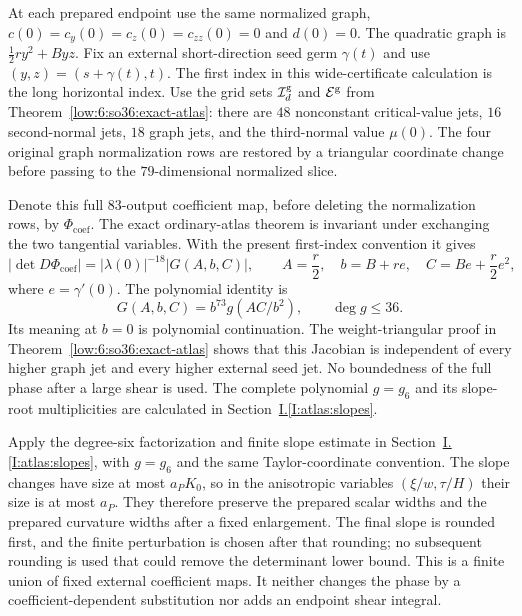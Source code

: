 \documentclass[11pt]{amsart}
\theoremstyle{definition}
\theoremstyle{remark}
\numberwithin{equation}{section}
\newcommand{\partIref}[1]{\hyperref[I:#1]{I.\ref*{I:#1}}}
\begin{document}
At each prepared endpoint use the same normalized graph, $c(0)=c_y(0)=c_z(0)=c_{zz}(0)=0$ and $d(0)=0$. The quadratic graph is $\tfrac12ry^2+Byz$. Fix an external short-direction seed germ $\gamma(t)$ and use $(y,z)=(s+\gamma(t),t)$. The first index in this wide-certificate calculation is the long horizontal index. Use the grid sets $\mathcal I_d^{\rm g}$ and $\mathcal E^{\rm g}$ from Theorem~\ref{low:6:so36:exact-atlas}: there are $48$ nonconstant critical-value jets, $16$ second-normal jets, $18$ graph jets, and the third-normal value $\mu(0)$. The four original graph normalization rows are restored by a triangular coordinate change before passing to the $79$-dimensional normalized slice.

Denote this full $83$-output coefficient map, before deleting the normalization rows, by $\Phi_{\mathrm{coef}}$. The exact ordinary-atlas theorem is invariant under exchanging the two tangential variables. With the present first-index convention it gives
\begin{equation}\label{low:6:wc36:atlas}
 |\det D\Phi_{\mathrm{coef}}|=|\lambda(0)|^{-18}|G(A,b,C)|,
 \qquad A=\frac r2,\quad b=B+re,\quad C=Be+\frac r2e^2,
\end{equation}
where $e=\gamma'(0)$. The polynomial identity is
\begin{equation}\label{low:6:wc36:G}
G(A,b,C)=b^{73}g(AC/b^2),\qquad \deg g\le36.
\end{equation}
Its meaning at $b=0$ is polynomial continuation. The weight-triangular proof in Theorem~\ref{low:6:so36:exact-atlas} shows that this Jacobian is independent of every higher graph jet and every higher external seed jet. No boundedness of the full phase after a large shear is used. The complete polynomial $g=g_6$ and its slope-root multiplicities are calculated in Section~\partIref{atlas:slopes}.

Apply the degree-six factorization and finite slope estimate in Section~\partIref{atlas:slopes}, with $g=g_6$ and the same Taylor-coordinate convention.
The slope changes have size at most $a_PK_0$, so in the anisotropic variables $(\xi/w,\tau/H)$ their size is at most $a_P$. They therefore preserve the prepared scalar widths and the prepared curvature widths after a fixed enlargement. The final slope is rounded first, and the finite perturbation is chosen after that rounding; no subsequent rounding is used that could remove the determinant lower bound. This is a finite union of fixed external coefficient maps. It neither changes the phase by a coefficient-dependent substitution nor adds an endpoint shear integral.
\end{document}

